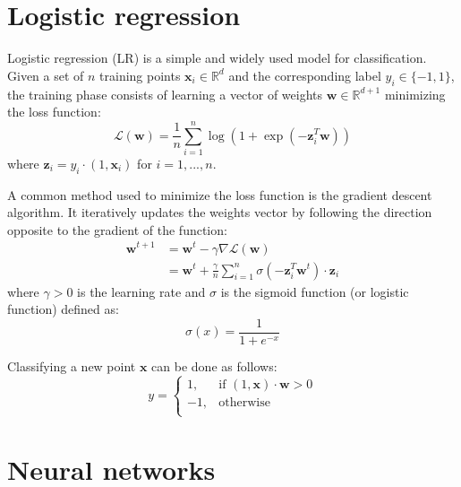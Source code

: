 \documentclass[a4paper,11pt,oneside]{report}
\begin{document}

\section{Logistic regression}

Logistic regression (LR) is a simple and widely used model for classification. 
Given a set of $n$ training points $\mathbf{x}_i \in \mathbb{R}^d$ and the corresponding label $y_i \in \{-1,1\}$, the training phase consists of learning a vector of weights $\mathbf{w} \in \mathbb{R}^{d+1}$ minimizing the loss function:
\begin{equation}\label{eq:logistic_reg_train}
    \mathcal{L}(\mathbf{w}) = \frac{1}{n} \sum_{i=1}^{n} \log(1 + \exp(-\mathbf{z}_i^T \mathbf{w})) 
\end{equation}
where $\mathbf{z}_i = y_i \cdot (1, \mathbf{x}_i)$ for $i=1,...,n$.

A common method used to minimize the loss function is the gradient descent algorithm. 
It iteratively updates the weights vector by following the direction opposite to the gradient of the function:
\begin{align}\label{eq:gradient_descent}
    \mathbf{w}^{t+1} & = \mathbf{w}^t - \gamma\nabla\mathcal{L}(\mathbf{w}) \nonumber \\ 
    & = \mathbf{w}^t + \frac{\gamma}{n} \sum_{i=1}^{n} \sigma(-\mathbf{z}_i^T \mathbf{w}^t) \cdot \mathbf{z}_i
\end{align}
where $\gamma > 0$ is the learning rate and $\sigma$ is the sigmoid function (or logistic function) defined as:
\begin{equation}\label{eq:sigmoid}
    \sigma(x) = \frac{1}{1 + e^{-x}}
\end{equation}

Classifying a new point $\mathbf{x}$ can be done as follows:
\begin{equation}\label{eq:logistic_reg_pred}
    y = 
    \begin{cases}
        1, & \text{if } (1, \mathbf{x}) \cdot \mathbf{w} > 0 \\
        -1, & \text{otherwise} \\
    \end{cases}
\end{equation}

\section{Neural networks}
\end{document}
